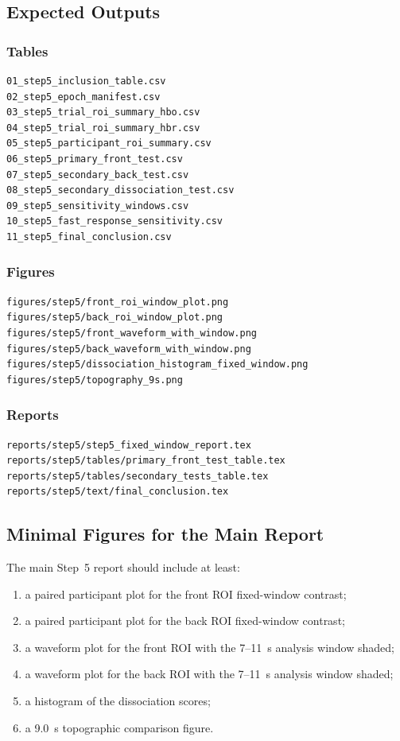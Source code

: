 \documentclass[11pt]{article}
\begin{document}
\subsection{Expected Outputs}

\subsubsection*{Tables}
\begin{verbatim}
01_step5_inclusion_table.csv
02_step5_epoch_manifest.csv
03_step5_trial_roi_summary_hbo.csv
04_step5_trial_roi_summary_hbr.csv
05_step5_participant_roi_summary.csv
06_step5_primary_front_test.csv
07_step5_secondary_back_test.csv
08_step5_secondary_dissociation_test.csv
09_step5_sensitivity_windows.csv
10_step5_fast_response_sensitivity.csv
11_step5_final_conclusion.csv
\end{verbatim}

\subsubsection*{Figures}
\begin{verbatim}
figures/step5/front_roi_window_plot.png
figures/step5/back_roi_window_plot.png
figures/step5/front_waveform_with_window.png
figures/step5/back_waveform_with_window.png
figures/step5/dissociation_histogram_fixed_window.png
figures/step5/topography_9s.png
\end{verbatim}

\subsubsection*{Reports}
\begin{verbatim}
reports/step5/step5_fixed_window_report.tex
reports/step5/tables/primary_front_test_table.tex
reports/step5/tables/secondary_tests_table.tex
reports/step5/text/final_conclusion.tex
\end{verbatim}

\subsection{Minimal Figures for the Main Report}
The main Step~5 report should include at least:
\begin{enumerate}
    \item a paired participant plot for the front ROI fixed-window contrast;
    \item a paired participant plot for the back ROI fixed-window contrast;
    \item a waveform plot for the front ROI with the 7--11~s analysis window shaded;
    \item a waveform plot for the back ROI with the 7--11~s analysis window shaded;
    \item a histogram of the dissociation scores;
    \item a 9.0~s topographic comparison figure.
\end{enumerate}
\end{document}
